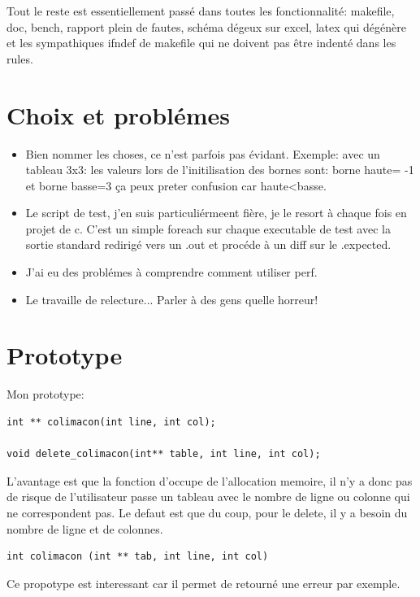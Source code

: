 \documentclass[a4paper]{article}
\begin{document}
Tout le reste est essentiellement passé dans toutes les fonctionnalité:
makefile, doc, bench, rapport plein de fautes, schéma dégeux sur excel, latex
qui dégénère et les sympathiques ifndef de makefile qui ne doivent pas être
indenté dans les rules.

\section{Choix et problémes}

\begin{itemize}
  \item Bien nommer les choses, ce n'est parfois pas évidant. Exemple:
    avec un tableau 3x3: les valeurs lors de l'initilisation
    des bornes sont: borne haute= -1 et borne basse=3 ça peux preter confusion
    car haute\textless basse.
  \item Le script de test, j'en suis particuliérmeent fière, je le resort à
    chaque fois en projet de c. C'est un simple foreach sur chaque executable
    de test avec la sortie standard redirigé vers un .out et procéde à un diff
    sur le .expected.
  \item J'ai eu des problémes à comprendre comment utiliser perf.
  \item Le travaille de relecture... Parler à des gens quelle horreur!
\end{itemize}


\section{Prototype}

Mon prototype:
\begin{lstlisting}[frame=single]
int ** colimacon(int line, int col);

void delete_colimacon(int** table, int line, int col);
\end{lstlisting}

L'avantage est que la fonction d'occupe de
l'allocation memoire, il n'y a donc pas de risque de l'utilisateur passe
un tableau avec le nombre de ligne ou colonne qui ne correspondent pas.
Le defaut est que du coup, pour le delete, il y a besoin du nombre
de ligne et de colonnes.

\begin{lstlisting}[frame=single]
int colimacon (int ** tab, int line, int col)
\end{lstlisting}

Ce propotype est interessant car il permet de retourné une erreur par exemple.
\end{document}
